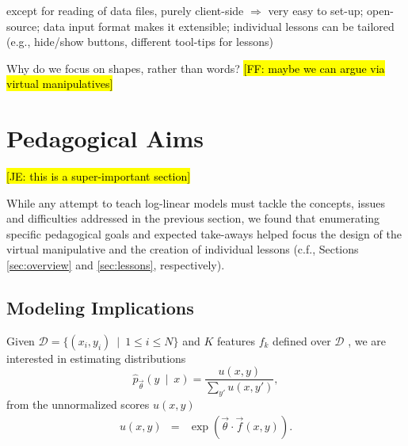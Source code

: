 \documentclass[11pt,letterpaper]{article}
\newcommand{\Note}[1]{}
\renewcommand{\Note}[1]{\hl{[#1]}}
\newcommand{\NoteSigned}[3]{{\sethlcolor{#2}\Note{#1: #3}}}
\newcommand{\NoteFF}[1]{\NoteSigned{FF}{LightBlue}{#1}}
\newcommand{\NoteJE}[1]{\NoteSigned{JE}{LightGreen}{#1}}
\newcommand{\Data}[0]{\ensuremath{\mathcal{D}}}
\begin{document}
except for reading of data files, purely client-side $\Rightarrow$ very easy to set-up;
open-source;
data input format makes it extensible;
individual lessons can be tailored (e.g., hide/show buttons, different tool-tips for lessons)

Why do we focus on shapes, rather than words? \NoteFF{maybe we can argue via virtual manipulatives}





\section{Pedagogical Aims}\label{sec:aims}

\NoteJE{this is a super-important section}

While any attempt to teach log-linear models must tackle the concepts, issues and difficulties addressed in the previous section, we found that enumerating specific pedagogical goals and expected take-aways helped focus the design of the virtual manipulative and the creation of individual lessons (c.f., Sections \ref{sec:overview} and \ref{sec:lessons}, respectively).

\subsection{Modeling Implications}
Given $\Data{} = \{( x_i, y_i)\ \mid\ 1 \le i \le N\}$ and $K$ features 
$f_k$ defined over \Data{} , we are interested in estimating distributions 
\begin{equation}
\hat{p}_{\vec{\theta}}\left(y\ \mid\ x\right) = \frac{u(x, y)}{\sum_{y'} u(x,y')},
\label{eqn:conditional_loglin}
\end{equation}
from the unnormalized scores $u(x,y)$
\begin{eqnarray}
u(x,y) & = & \exp{\left(\vec{\theta}\cdot \vec{f}(x,y)\right)}.%
\end{eqnarray}
\end{document}
